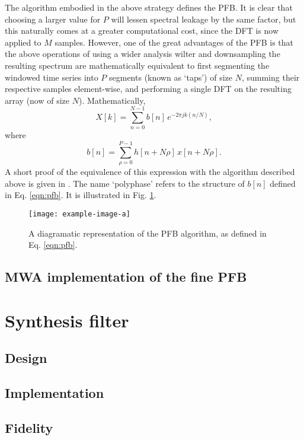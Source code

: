 \documentclass{pasa}%
\begin{document}
The algorithm embodied in the above strategy defines the PFB.
It is clear that choosing a larger value for $P$ will lessen spectral leakage by the same factor, but this naturally comes at a greater computational cost, since the DFT is now applied to $M$ samples.
However, one of the great advantages of the PFB is that the above operations of using a wider analysis wilter and downsampling the resulting spectrum are mathematically equivalent to first segmenting the windowed time series into $P$ segments (known as `taps') of size $N$, summing their respective samples element-wise, and performing a single DFT on the resulting array (now of size $N$).
Mathematically,
\begin{equation}
    X[k] = \sum_{n=0}^{N-1} b[n]\,e^{-2\pi j k (n/N)},
    \label{eqn:pfb}
\end{equation}
where
\begin{equation*}
    b[n] = \sum_{\rho=0}^{P-1} h[n + N\rho]\,x[n + N\rho].
\end{equation*}
A short proof of the equivalence of this expression with the algorithm described above is given in \citet{Harris2011}.
The name `polyphase' refers to the structure of $b[n]$ defined in Eq. \eqref{eqn:pfb}.
It is illustrated in Fig. \ref{fig:pfb}.
\begin{figure}
    \centering
    \texttt{[image: example-image-a]}
    \caption{A diagramatic representation of the PFB algorithm, as defined in Eq. \eqref{eqn:pfb}.}
    \label{fig:pfb}
\end{figure}

\subsection{MWA implementation of the fine PFB}

\section{Synthesis filter}
\label{sec:ipfb}

\subsection{Design}

\subsection{Implementation}

\subsection{Fidelity}
\end{document}
